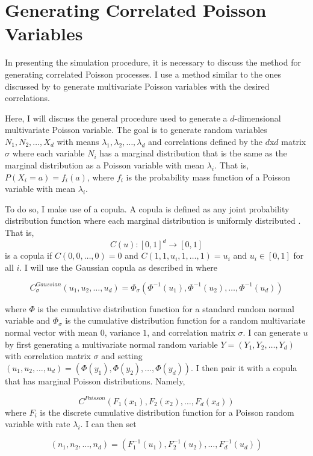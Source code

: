 \section{Generating Correlated Poisson Variables}\label{ch:generate_correlated_poisson}
In presenting the simulation procedure, it is necessary to discuss the method for generating correlated Poisson processes. I use a method similar to the ones discussed by \cite{A8} to generate multivariate Poisson variables with the desired correlations. 

Here, I will discuss the general procedure used to generate a $d$-dimensional multivariate Poisson variable. The goal is to generate random variables $N_1, N_2, \ldots, X_d$ with means $\lambda_1, \lambda_2, \ldots, \lambda_{d}$ and correlations defined by the $d$x$d$ matrix $\sigma$ where each variable $N_i$ has a marginal distribution that is the same as the marginal distribution as a Poisson variable with mean $\lambda_i$. That is, $P(X_i = a) = f_i(a)$, where $f_i$ is the probability mass function of a Poisson variable with mean $\lambda_i$.

To do so, I make use of a copula. A copula is defined as any joint probability distribution function where each marginal distribution is uniformly distributed \cite{B1}. That is, 
$$C(u): [0,1]^d \to [0,1]$$ 
is a copula if $C(0, 0, \ldots, 0) = 0$ and $C(1, 1, u_i, 1, \ldots, 1) = u_i$ and $u_i \in [0,1]$ for all $i$. I will use the Gaussian copula as described in \cite{A8} where

$$ C_\sigma^{Gaussian}(u_1, u_2, \ldots, u_d) = \Phi_\sigma(\Phi^{-1}(u_1), \Phi^{-1}(u_2), \ldots,  \Phi^{-1}(u_d))$$

where $\Phi$ is the cumulative distribution function for a standard random normal variable and $\Phi_\sigma$ is the cumulative distribution function for a random multivariate normal vector with mean $0$, variance $1$, and correlation matrix $\sigma$. I can generate $u$ by first generating a multivariate normal random variable $Y = (Y_1,Y_2, \ldots, Y_d)$ with correlation matrix $\sigma$ and setting $(u_1, u_2, \ldots, u_d) = (\Phi(y_1), \Phi(y_2), \ldots,  \Phi(y_d))$. I then pair it with a copula that has marginal Poisson distributions. Namely,

$$ C^{Poisson}(F_1(x_1), F_2(x_2), \ldots, F_d(x_d))$$ where $F_i$ is the discrete cumulative distribution function for a Poisson random variable with rate $\lambda_i$. I can then set

$$(n_1, n_2, \ldots, n_d) = (F^{-1}_1(u_1), F^{-1}_2(u_2), \ldots, F^{-1}_d(u_d))$$

